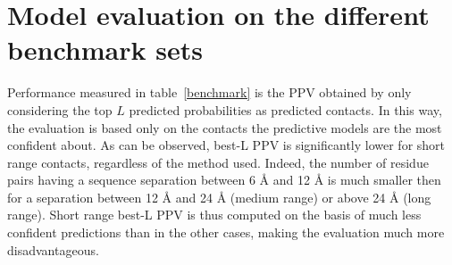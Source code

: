 \section{Model evaluation on the different benchmark sets}

    Performance measured in table~\ref{benchmark} is the PPV obtained
    by only considering the top $L$ predicted probabilities as predicted
    contacts. In this way, the evaluation is based only on the contacts
    the predictive models are the most confident about.
    As can be observed, best-L PPV is significantly lower for short range contacts,
    regardless of the method used. Indeed, the number of residue pairs having a
    sequence separation between 6 \AA{} and 12 \AA{} is much smaller then for a
    separation between 12 \AA{} and 24 \AA{} (medium range) or above 24 \AA{} (long range).
    Short range best-L PPV is thus computed on the basis of much less confident
    predictions than in the other cases, making the evaluation much more disadvantageous.

    \begin{table}[H]
        \centering
        \label{benchmark}
    \end{table}

